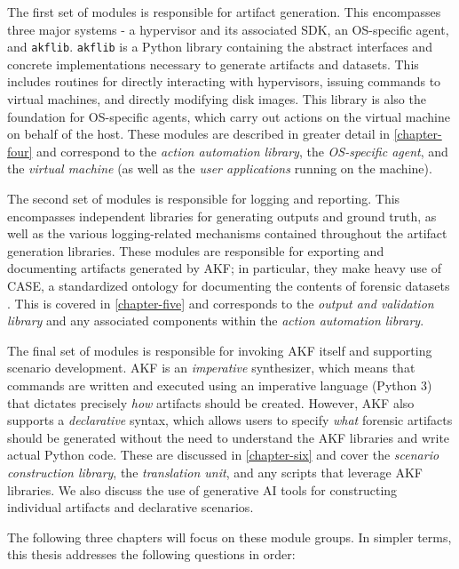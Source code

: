 \documentclass[letterpaper,12pt]{report}
\newcommand{\passthrough}[1]{#1}
\begin{document}
The first set of modules is responsible for artifact generation. This
encompasses three major systems - a hypervisor and its associated SDK,
an OS-specific agent, and \passthrough{\lstinline!akflib!}.
\passthrough{\lstinline!akflib!} is a Python library containing the
abstract interfaces and concrete implementations necessary to generate
artifacts and datasets. This includes routines for directly interacting
with hypervisors, issuing commands to virtual machines, and directly
modifying disk images. This library is also the foundation for
OS-specific agents, which carry out actions on the virtual machine on
behalf of the host. These modules are described in greater detail in
\autoref{chapter-four} and correspond to the \emph{action
automation library}, the \emph{OS-specific agent}, and the \emph{virtual
machine} (as well as the \emph{user applications} running on the
machine).

The second set of modules is responsible for logging and reporting. This
encompasses independent libraries for generating outputs and ground
truth, as well as the various logging-related mechanisms contained
throughout the artifact generation libraries. These modules are
responsible for exporting and documenting artifacts generated by AKF; in
particular, they make heavy use of CASE, a standardized ontology for
documenting the contents of forensic datasets
\cite{caseyAdvancingCoordinatedCyberinvestigations2017}. This is
covered in \autoref{chapter-five} and corresponds to the
\emph{output and validation library} and any associated components
within the \emph{action automation library}.

The final set of modules is responsible for invoking AKF itself and
supporting scenario development. AKF is an \emph{imperative}
synthesizer, which means that commands are written and executed using an
imperative language (Python 3) that dictates precisely \emph{how}
artifacts should be created. However, AKF also supports a
\emph{declarative} syntax, which allows users to specify \emph{what}
forensic artifacts should be generated without the need to understand
the AKF libraries and write actual Python code. These are discussed in
\autoref{chapter-six} and cover the \emph{scenario
construction library}, the \emph{translation unit}, and any scripts that
leverage AKF libraries. We also discuss the use of generative AI tools
for constructing individual artifacts and declarative scenarios.

The following three chapters will focus on these module groups. In
simpler terms, this thesis addresses the following questions in order:
\end{document}
